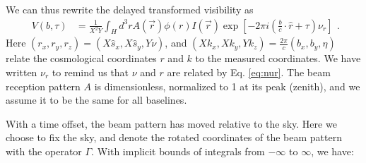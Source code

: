 \documentclass[preprint2,numberedappendix,tighten,twocolappendix]{aastex6}  %
\renewcommand\[{\begin{equation}}
\renewcommand\]{\end{equation}}
\begin{document}
We can thus rewrite the delayed transformed visibility as 
\small
\[
\boxed{\begin{aligned}V(b,\tau) & =\frac{1}{X^{2}Y}\int_{H}d^{3}rA(\vec{r})\phi(r)I(\vec{r})\exp\left[-2\pi i\left(\frac{b}{c}\cdot\hat{r}+\tau\right)\nu_{r}\right]\end{aligned}
}.
\]
\normalsize
Here $(r_{x},r_{y},r_{z})=(X\hat{s}_{x},X\hat{s}_{y},Y\nu)$, and
$(Xk_{x},Xk_{y},Yk_{z})=\frac{2\pi}{c}(b_{x},b_{y},\eta)$ relate
the cosmological coordinates $r$ and $k$ to the measured coordinates.
We have written $\nu_{r}$ to remind us that $\nu$ and $r$ are related
by Eq. \eqref{eq:nur}. The beam reception pattern $A$ is dimensionless,
normalized to 1 at its peak (zenith), and we assume it to be the same
for all baselines. 

With a time offset, the beam pattern has moved relative to the sky.
Here we choose to fix the sky, and denote the rotated coordinates
of the beam pattern with the operator $\Gamma$. With implicit bounds
of integrals from $-\infty$ to $\infty$, we have:
\end{document}
